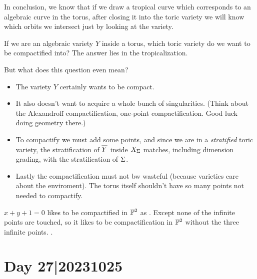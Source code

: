 \documentclass[12pt]{memoir}
\begin{document}
In conclusion, we know that if we draw a tropical curve which corresponds to an algebraic curve in the torus, after closing it into the toric variety we will know which orbits we intersect just by looking at the variety.\par 
If we are an algebraic variety $Y$ inside a torus, which toric variety do we want to be compactified into? The answer lies in the tropicalization.\par 
But what does this question even mean? 
\begin{itemize}
    \item The variety $Y$ certainly wants to be compact.
    \item It also doesn't want to acquire a whole bunch of singularities. (Think about the Alexandroff compactification, one-point compactification. Good luck doing geometry there.)
    \item To compactify we must add some points, and since we are in a \emph{stratified} toric variety, the stratification of $\overline Y$ inside $X_\Sigma$ matches, including dimension grading, with the stratification of $\Sigma$. 
    \item Lastly the compactification must not bw wasteful (because varieties care about the enviroment). The torus itself shouldn't have so many points not needed to compactify.
\end{itemize}
$x+y+1=0$ likes to be compactified in $\mathbb{P}^2$ as . Except none of the infinite points are touched, so it likes to be compactification in $\mathbb{P}^2$ without the three infinite points. .

\section{Day 27|20231025}
\end{document}
